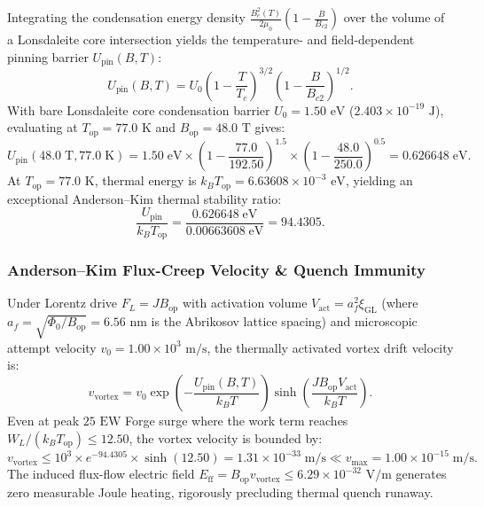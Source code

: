 \documentclass[11pt,onecolumn]{article}
\begin{document}
Integrating the condensation energy density $\frac{B_c^2(T)}{2\mu_0}\left(1 - \frac{B}{B_{c2}}\right)$ over the volume of a Lonsdaleite core intersection yields the temperature- and field-dependent pinning barrier $U_{\mathrm{pin}}(B, T)$:
\begin{equation}
U_{\mathrm{pin}}(B, T) = U_0 \left(1 - \frac{T}{T_c}\right)^{3/2}\left(1 - \frac{B}{B_{c2}}\right)^{1/2}.
\end{equation}
With bare Lonsdaleite core condensation barrier $U_0 = 1.50\text{ eV}$ ($2.403 \times 10^{-19}\text{ J}$), evaluating at $T_{\mathrm{op}} = 77.0\text{ K}$ and $B_{\mathrm{op}} = 48.0\text{ T}$ gives:
\begin{equation}
U_{\mathrm{pin}}(48.0\;\mathrm{T}, 77.0\;\mathrm{K}) = 1.50\;\mathrm{eV} \times \left(1 - \frac{77.0}{192.50}\right)^{1.5} \times \left(1 - \frac{48.0}{250.0}\right)^{0.5} = 0.626648\;\mathrm{eV}.
\end{equation}
At $T_{\mathrm{op}} = 77.0\text{ K}$, thermal energy is $k_B T_{\mathrm{op}} = 6.63608 \times 10^{-3}\text{ eV}$, yielding an exceptional Anderson--Kim thermal stability ratio:
\begin{equation}
\frac{U_{\mathrm{pin}}}{k_B T_{\mathrm{op}}} = \frac{0.626648\;\mathrm{eV}}{0.00663608\;\mathrm{eV}} = 94.4305.
\end{equation}

\subsubsection{Anderson--Kim Flux-Creep Velocity \& Quench Immunity}
Under Lorentz drive $F_L = J B_{\mathrm{op}}$ with activation volume $V_{\mathrm{act}} = a_f^2 \xi_{\mathrm{GL}}$ (where $a_f = \sqrt{\Phi_0 / B_{\mathrm{op}}} = 6.56\text{ nm}$ is the Abrikosov lattice spacing) and microscopic attempt velocity $v_0 = 1.00 \times 10^3\text{ m/s}$, the thermally activated vortex drift velocity is:
\begin{equation}
v_{\mathrm{vortex}} = v_0 \exp\left(-\frac{U_{\mathrm{pin}}(B, T)}{k_B T}\right)\sinh\left(\frac{J B_{\mathrm{op}} V_{\mathrm{act}}}{k_B T}\right).
\end{equation}
Even at peak $25\text{ EW}$ Forge surge where the work term reaches $W_L / (k_B T_{\mathrm{op}}) \le 12.50$, the vortex velocity is bounded by:
\begin{equation}
v_{\mathrm{vortex}} \le 10^3 \times e^{-94.4305} \times \sinh(12.50) = 1.31 \times 10^{-33}\;\mathrm{m/s} \ll v_{\mathrm{max}} = 1.00 \times 10^{-15}\;\mathrm{m/s}.
\end{equation}
The induced flux-flow electric field $E_{\mathrm{ff}} = B_{\mathrm{op}} v_{\mathrm{vortex}} \le 6.29 \times 10^{-32}\text{ V/m}$ generates zero measurable Joule heating, rigorously precluding thermal quench runaway.
\end{document}
